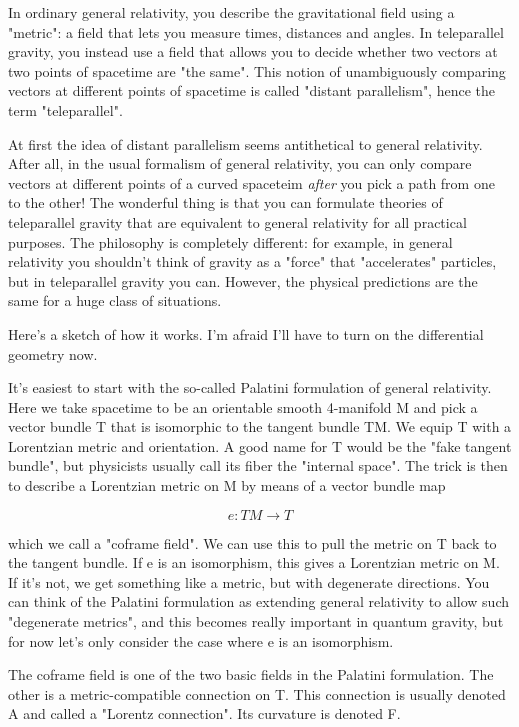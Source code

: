 In ordinary general relativity, you describe the gravitational field
using a "metric": a field that lets you measure times, distances and
angles.  In teleparallel gravity, you instead use a field that allows
you to decide whether two vectors at two points of spacetime are "the
same".   This notion of unambiguously comparing vectors at different
points of spacetime is called "distant parallelism", hence the term
"teleparallel".  

At first the idea of distant parallelism seems antithetical to general
relativity.  After all, in the usual formalism of general relativity,
you can only compare vectors at different points of a curved spaceteim
\emph{after} you pick a path from one to the other!  The wonderful thing is
that you can formulate theories of teleparallel gravity that are
equivalent to general relativity for all practical purposes.  The
philosophy is completely different: for example, in general relativity
you shouldn't think of gravity as a "force" that "accelerates"
particles, but in teleparallel gravity you can.  However, the physical
predictions are the same for a huge class of situations.

Here's a sketch of how it works.  I'm afraid I'll have to turn on the
differential geometry now.

It's easiest to start with the so-called Palatini formulation of general
relativity.  Here we take spacetime to be an orientable smooth
4-manifold M and pick a vector bundle T that is isomorphic to the
tangent bundle TM.  We equip T with a Lorentzian metric and orientation.
A good name for T would be the "fake tangent bundle", but physicists
usually call its fiber the "internal space".  The trick is then to
describe a Lorentzian metric on M by means of a vector bundle map

$$
e: TM \to  T  
$$
    
which we call a "coframe field".  We can use this to pull the metric on
T back to the tangent bundle.  If e is an isomorphism, this gives a
Lorentzian metric on M.  If it's not, we get something like a metric,
but with degenerate directions.  You can think of the Palatini
formulation as extending general relativity to allow such "degenerate
metrics", and this becomes really important in quantum gravity, but for
now let's only consider the case where e is an isomorphism.

The coframe field is one of the two basic fields in the Palatini
formulation.  The other is a metric-compatible connection on T.  
This connection is usually denoted A and called a "Lorentz connection".  
Its curvature is denoted F.

